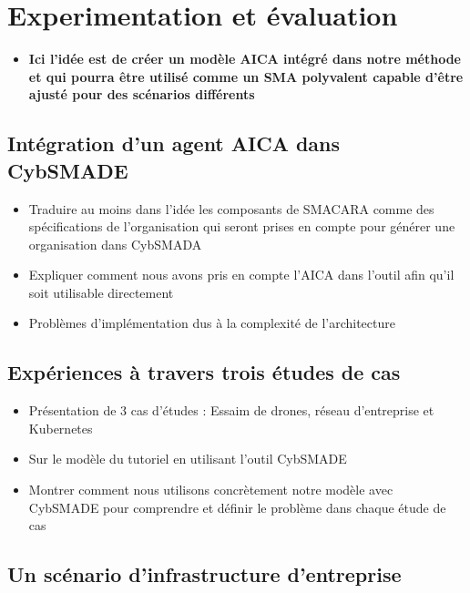 \chapter{Experimentation et évaluation}\label{ch:case_studies} %

\begin{itemize}
    \item \textbf{Ici l'idée est de créer un modèle AICA intégré dans notre méthode et qui pourra être utilisé comme un SMA polyvalent capable d'être ajusté pour des scénarios différents}
\end{itemize}


\section{Intégration d'un agent AICA dans CybSMADE}
\begin{itemize}
    \item Traduire au moins dans l'idée les composants de SMACARA comme des spécifications de l'organisation qui seront prises en compte pour générer une organisation dans CybSMADA
    \item Expliquer comment nous avons pris en compte l'AICA dans l'outil afin qu'il soit utilisable directement
    \item Problèmes d'implémentation dus à la complexité de l'architecture
\end{itemize}


\section{Expériences à travers trois études de cas}
\begin{itemize}
    \item Présentation de 3 cas d'études : Essaim de drones, réseau d'entreprise et Kubernetes
    \item Sur le modèle du tutoriel en utilisant l'outil CybSMADE
    \item Montrer comment nous utilisons concrètement notre modèle avec CybSMADE pour comprendre et définir le problème dans chaque étude de cas
\end{itemize}

\section{Un scénario d'infrastructure d'entreprise}

